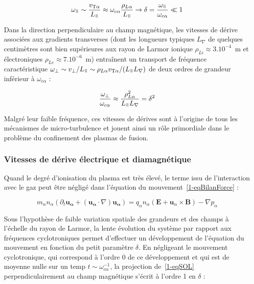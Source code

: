 \begin{refsection}
\begin{equation}
\omega_\para\sim
\frac{v_{\text{T}\alpha}}{L_\para}\approx\omega_{c\alpha}\frac{\rho_{L\alpha}}{L_\para}\rightarrow
\delta=\frac{\omega_\para}{\omega_{c\alpha}}\ll1
\end{equation} 

Dans la direction perpendiculaire au champ
magnétique, les vitesses de dérive associées aux gradients transverses (dont les longueurs
typiques $L_\nabla$ de quelques centimètres sont bien supérieures aux rayon de
Larmor ionique $\rho_{Li}\approx3.10^{-4}$~m et électroniques
$\rho_{Le}\approx7.10^{-6}$~m) entraînent un transport de fréquence
caractéristique $\omega_\perp\sim v_\perp/L_\para\sim\rho_{L\alpha}
v_{\text{T}\alpha}/(L_\para L_\nabla)$ de deux ordres de grandeur inférieur à
$\omega_{c\alpha}$ :

\begin{equation}
\frac{\omega_\perp}{\omega_{c\alpha}}\approx\frac{\rho_{L\alpha}^2}{L_\para
L_\nabla}=\delta^2
\end{equation}

Malgré leur faible fréquence, ces vitesses de dérives sont à l'origine de tous
les mécanismes de micro-turbulence et jouent ainsi un rôle primordiale dans le
problème du confinement des plasmas de fusion.

\subsubsection{Vitesses de dérive électrique et diamagnétique}

Quand le degré d'ionisation du plasma est très élevé, le terme issu de
l'interaction avec le gaz peut être négligé dans l'équation du
mouvement~\eqref{1-eqBilanForce} :

\begin{equation}
\label{1-eqSOL}
 m_\alpha n_\alpha\left(\partial_t \mathbf{u_\alpha} +
(\mathbf{u_\alpha}\cdot\nabla)\mathbf{u_\alpha}\right)
={q_\alpha n_\alpha}\left(\mathbf E+\mathbf
u_\alpha\times \mathbf B\right)
-{\nabla p_\alpha}
\end{equation}

 Sous l'hypothèse de faible variation spatiale des grandeurs et des champs à
 l'échelle du rayon de Larmor, la lente évolution du système par rapport aux
 fréquences cyclotroniques permet d'effectuer un développement de l'équation du
 mouvement en fonction du petit paramètre $\delta$. En négligeant le
 mouvement cyclotronique, qui correspond à l'ordre 0 de ce développement et qui
 est de moyenne nulle sur un temp $t\sim\omega_{c\alpha}^{-1}$, la projection
 de~\eqref{1-eqSOL} perpendiculairement au champ magnétique s'écrit à l'ordre 1
 en $\delta$ :
 

\end{refsection}
